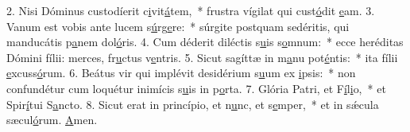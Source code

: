 2. Nisi Dóminus custodíerit c\uline{i}vit\uline{á}tem,~* frustra vígilat qui cust\uline{ó}dit \uline{e}am.
3. Vanum est vobis ante lucem s\uline{ú}rg\uline{e}re:~* súrgite postquam sedéritis, qui manducátis p\uline{a}nem dol\uline{ó}ris.
4. Cum déderit diléctis s\uline{u}is s\uline{o}mnum:~* ecce heréditas Dómini fílii: merces, fr\uline{u}ctus v\uline{e}ntris.
5. Sicut sagíttæ in m\uline{a}nu pot\uline{é}ntis:~* ita fílii \uline{e}xcuss\uline{ó}rum.
6. Beátus vir qui implévit desidérium s\uline{u}um ex \uline{i}psis:~* non confundétur cum loquétur inimícis s\uline{u}is in p\uline{o}rta.
7. Glória Patri, et F\uline{í}l\uline{i}o,~* et Spir\uline{í}tui S\uline{a}ncto.
8. Sicut erat in princípio, et n\uline{u}nc, et s\uline{e}mper,~* et in sǽcula sæcul\uline{ó}rum. \uline{A}men.
